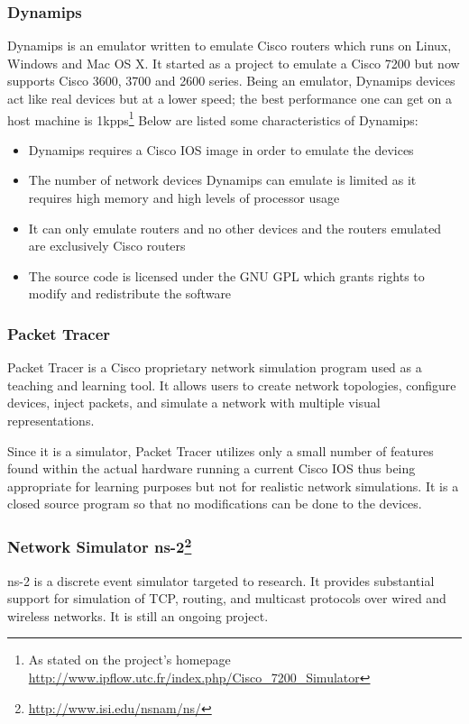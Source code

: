 \subsubsection{Dynamips}
Dynamips is an emulator written to emulate Cisco routers which runs on Linux, Windows and Mac OS X. It started as a project to emulate a Cisco 7200 but now supports  Cisco 3600, 3700 and 2600 series.
Being an emulator, Dynamips devices act like real devices but at a lower speed; the best performance one can get on a host machine is 1kpps\footnote{As stated on the project's homepage \url{http://www.ipflow.utc.fr/index.php/Cisco_7200_Simulator}}
Below are listed some characteristics of Dynamips:
\begin{itemize}
\item Dynamips requires a Cisco IOS image in order to emulate the devices 
\item The number of network devices Dynamips can emulate is limited as it requires high memory and high levels of  processor usage
\item It can only emulate routers and no other devices and the routers emulated are exclusively Cisco routers
\item The source code is licensed under the GNU GPL which grants rights to modify and redistribute the software
\end{itemize}

\subsubsection{Packet Tracer}
Packet Tracer is a Cisco proprietary network simulation program used as a teaching and learning tool. 
It allows users to create network topologies, configure devices, inject packets, and simulate a network with multiple visual representations.

Since it is a simulator, Packet Tracer utilizes only a small number of features found within the actual 
hardware running a current Cisco IOS thus being appropriate for learning purposes but not for realistic network simulations.
It is a closed source program so that no modifications can be done to the devices.

\subsubsection[Network Simulator ns-2]{Network Simulator ns-2\footnote{\url{http://www.isi.edu/nsnam/ns/}}}

ns-2 is a discrete event simulator targeted to research. It provides substantial support for simulation of TCP, routing, and multicast protocols over wired and wireless networks. It is still an ongoing project.
